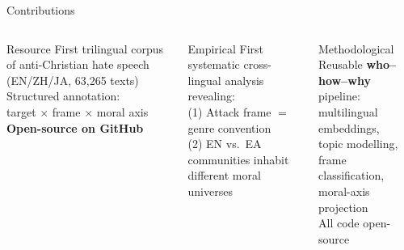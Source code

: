 \documentclass[aspectratio=169,10pt]{beamer}
\begin{document}
\begin{frame}{Contributions}
  \begin{columns}[T]
      \begin{block}{Resource}
        \small
        First trilingual corpus of anti-Christian hate speech (EN/ZH/JA, 63,265 texts)\\[4pt]
        Structured annotation:\\
        target $\times$ frame $\times$ moral axis\\[4pt]
        \textbf{Open-source on GitHub}
      \end{block}
      \begin{block}{Empirical}
        \small
        First systematic cross-lingual analysis revealing:\\[4pt]
        (1) Attack frame $=$ genre convention\\[4pt]
        (2) EN vs.\ EA communities inhabit different moral universes
      \end{block}
      \begin{block}{Methodological}
        \small
        Reusable \textbf{who--how--why} pipeline:\\[4pt]
        multilingual embeddings,\\
        topic modelling,\\
        frame classification,\\
        moral-axis projection\\[4pt]
        All code open-source
      \end{block}
  \end{columns}
\end{frame}
\end{document}
